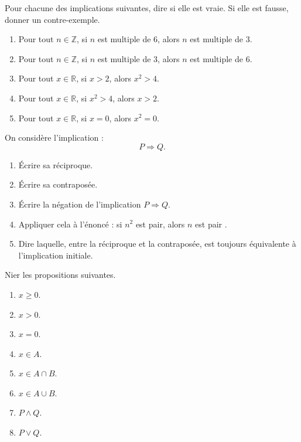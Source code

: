 \documentclass[11pt,a4paper]{article}
\newcommand{\Z}{\mathbb{Z}}
\newcommand{\R}{\mathbb{R}}
\newcommand{\et}{\wedge}
\newcommand{\ou}{\vee}
\newcommand{\imp}{\Rightarrow}
\begin{document}
\begin{exercicebox}
Pour chacune des implications suivantes, dire si elle est vraie. Si elle est fausse, donner un contre-exemple.

\begin{enumerate}[label=\alph*)]
    \item Pour tout \(n\in\Z\), si \(n\) est multiple de \(6\), alors \(n\) est multiple de \(3\).
    \item Pour tout \(n\in\Z\), si \(n\) est multiple de \(3\), alors \(n\) est multiple de \(6\).
    \item Pour tout \(x\in\R\), si \(x>2\), alors \(x^2>4\).
    \item Pour tout \(x\in\R\), si \(x^2>4\), alors \(x>2\).
    \item Pour tout \(x\in\R\), si \(x=0\), alors \(x^2=0\).
\end{enumerate}
\end{exercicebox}

\begin{exercicebox}
On considère l'implication :
\[
P\imp Q.
\]

\begin{enumerate}[label=\alph*)]
    \item Écrire sa réciproque.
    \item Écrire sa contraposée.
    \item Écrire la négation de l'implication \(P\imp Q\).
    \item Appliquer cela à l'énoncé : \og si \(n^2\) est pair, alors \(n\) est pair \fg{}.
    \item Dire laquelle, entre la réciproque et la contraposée, est toujours équivalente à l'implication initiale.
\end{enumerate}
\end{exercicebox}

\begin{exercicebox}
Nier les propositions suivantes.

\begin{enumerate}[label=\alph*)]
    \item \(x\geq 0\).
    \item \(x>0\).
    \item \(x=0\).
    \item \(x\in A\).
    \item \(x\in A\cap B\).
    \item \(x\in A\cup B\).
    \item \(P\et Q\).
    \item \(P\ou Q\).
\end{enumerate}
\end{exercicebox}
\end{document}
